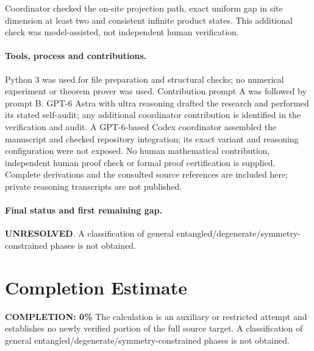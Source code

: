 \documentclass[11pt]{article}
\begin{document}
Coordinator checked the on-site projection path, exact uniform gap in site dimension at least two and consistent infinite product states. This additional check was model-assisted, not independent human verification.

\paragraph{Tools, process and contributions.}
Python 3 was used for file preparation and structural checks; no numerical experiment or theorem prover was used. Contribution prompt A was followed by prompt B. GPT-6 Astra with ultra reasoning drafted the research and performed its stated self-audit; any additional coordinator contribution is identified in the verification and audit. A GPT-6-based Codex coordinator assembled the manuscript and checked repository integration; its exact variant and reasoning configuration were not exposed. No human mathematical contribution, independent human proof check or formal proof certification is supplied. Complete derivations and the consulted source references are included here; private reasoning transcripts are not published.

\paragraph{Final status and first remaining gap.}
\textbf{UNRESOLVED}. A classification of general entangled/degenerate/symmetry-constrained phases is not obtained.

\section{Completion Estimate}
\noindent\textbf{COMPLETION: 0\%}
The calculation is an auxiliary or restricted attempt and establishes no newly verified portion of the full source target. A classification of general entangled/degenerate/symmetry-constrained phases is not obtained.
\end{document}
